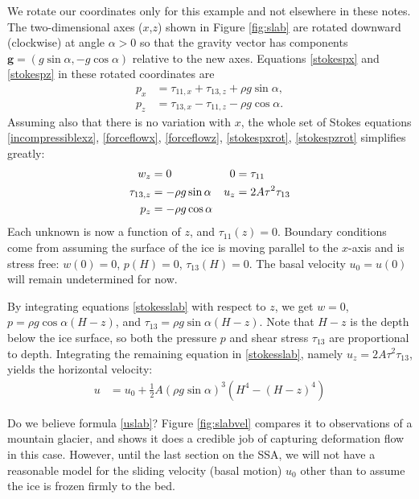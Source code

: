 \documentclass[letterpaper,final,12pt,reqno]{amsart}
\begin{document}
We rotate our coordinates only for this example and not elsewhere in these notes.  The two-dimensional axes ($x$,$z$) shown in Figure \ref{fig:slab} are rotated downward (clockwise) at angle $\alpha>0$ so that the gravity vector has components $\mathbf{g} = (g \sin\alpha,- g \cos \alpha)$ relative to the new axes.  Equations \eqref{stokespx} and \eqref{stokespz} in these rotated coordinates are
\begin{align}
p_x &= \tau_{11,x} + \tau_{13,z} + \rho g \sin\alpha, \label{stokespxrot} \\
p_z &= \tau_{13,x} - \tau_{11,z} - \rho g \cos\alpha. \label{stokespzrot}
\end{align}
Assuming also that there is no variation with $x$, the whole set of Stokes equations \eqref{incompressiblexz}, \eqref{forceflowx}, \eqref{forceflowz}, \eqref{stokespxrot}, \eqref{stokespzrot} simplifies greatly:
\begin{align}
w_z &= 0 &   0 &= \tau_{11} \label{stokesslab} \\
\tau_{13,z} &= - \rho g \sin\alpha &   u_z &= 2 A \tau^2 \tau_{13} \notag \\
p_z &= - \rho g \cos\alpha \notag
\end{align}
Each unknown is now a function of $z$, and $\tau_{11}(z)=0$.  Boundary conditions come from assuming the surface of the ice is moving parallel to the $x$-axis and is stress free: $w(0)=0$, $p(H)=0$, $\tau_{13}(H)=0$.  The basal velocity $u_0=u(0)$ will remain undetermined for now.

By integrating equations \eqref{stokesslab} with respect to $z$, we get $w=0$, $p = \rho g \cos\alpha (H-z)$, and $\tau_{13} = \rho g \sin\alpha (H-z)$.  Note that $H-z$ is the depth below the ice surface, so both the pressure $p$ and shear stress $\tau_{13}$ are proportional to depth.  Integrating the remaining equation in \eqref{stokesslab}, namely $u_z = 2 A \tau^2 \tau_{13}$, yields the horizontal velocity:
\begin{align}
u &= u_0 + \frac{1}{2} A (\rho g \sin\alpha)^3  \left(H^4 - (H-z)^4\right)  \label{uslab}
\end{align}

Do we believe formula \eqref{uslab}?  Figure \ref{fig:slabvel} compares it to observations of a mountain glacier, and shows it does a credible job of capturing deformation flow in this case.  However, until the last section on the SSA, we will not have a reasonable model for the sliding velocity (basal motion) $u_0$ other than to assume the ice is frozen firmly to the bed.
\end{document}
